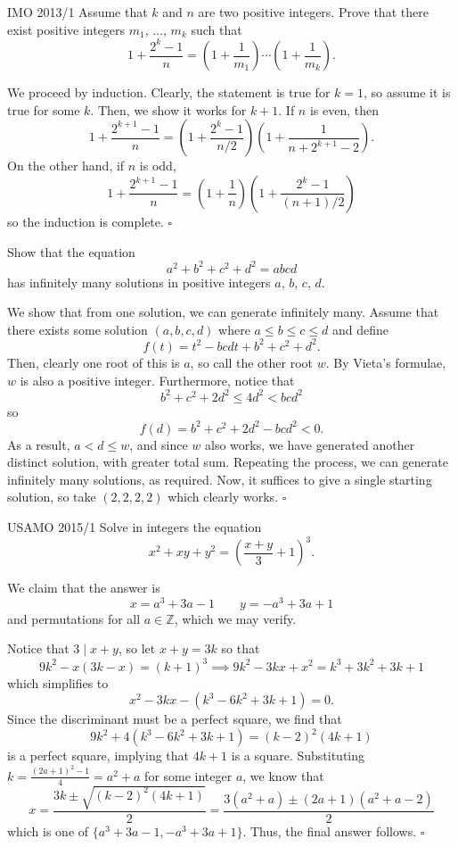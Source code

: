 \documentclass{article}
\begin{document}
\begin{problem}[4.9.11]{IMO 2013/1}
Assume that $k$ and $n$ are two positive integers. Prove that there exist positive integers $m_1$, $\dots$, $m_k$ such that \[1+\dfrac{2^k-1}{n} = \left(1+\dfrac{1}{m_1}\right)\cdots\left(1+\dfrac{1}{m_k}\right).\]
\end{problem}

We proceed by induction. Clearly, the statement is true for $k = 1$, so assume it is true for some $k$. Then, we show it works for $k+1$. If $n$ is even, then \[1+\dfrac{2^{k+1}-1}{n} = \left(1+\dfrac{2^k-1}{n/2}\right)\left(1+\dfrac{1}{n+2^{k+1}-2}\right).\] On the other hand, if $n$ is odd, \[1+\dfrac{2^{k+1}-1}{n} = \left(1+\dfrac{1}{n}\right)\left(1+\dfrac{2^k-1}{(n+1)/2}\right)\] so the induction is complete. $\square$

\begin{problem}[4.9.12]{}
Show that the equation \[a^2+b^2+c^2+d^2 = abcd\] has infinitely many solutions in positive integers $a$, $b$, $c$, $d$.
\end{problem}

We show that from one solution, we can generate infinitely many. Assume that there exists some solution $(a, b, c, d)$ where $a \le b \le c \le d$ and define \[f(t) = t^2-bcdt+b^2+c^2+d^2.\] Then, clearly one root of this is $a$, so call the other root $w$. By Vieta's formulae, $w$ is also a positive integer. Furthermore, notice that \[b^2+c^2+2d^2 \le 4d^2 < bcd^2\] so \[f(d) = b^2+c^2+2d^2-bcd^2 < 0.\] As a result, $a < d \le w$, and since $w$ also works, we have generated another distinct solution, with greater total sum. Repeating the process, we can generate infinitely many solutions, as required. Now, it suffices to give a single starting solution, so take $(2, 2, 2, 2)$ which clearly works. $\square$

\begin{problem}[4.9.13]{USAMO 2015/1}
Solve in integers the equation \[x^2+xy+y^2 = \left(\dfrac{x+y}{3}+1\right)^3.\]
\end{problem}

We claim that the answer is \[x = a^3+3a-1 \qquad y = -a^3+3a+1\] and permutations for all $a \in \mathbb{Z}$, which we may verify.

Notice that $3 \mid x+y$, so let $x+y = 3k$ so that \[9k^2-x(3k-x) = (k+1)^3 \implies 9k^2-3kx+x^2 = k^3+3k^2+3k+1\] which simplifies to \[x^2-3kx-(k^3-6k^2+3k+1) = 0.\] Since the discriminant must be a perfect square, we find that \[9k^2+4(k^3-6k^2+3k+1) = (k - 2)^2 (4 k + 1)\] is a perfect square, implying that $4k+1$ is a square. Substituting $k = \tfrac{(2a+1)^2-1}{4} = a^2+a$ for some integer $a$, we know that \[x = \dfrac{3k \pm \sqrt{(k-2)^2(4k+1)}}{2} = \dfrac{3(a^2+a) \pm (2a+1)(a^2+a-2)}{2}\] which is one of $\{a^3+3a-1, -a^3+3a+1\}$. Thus, the final answer follows. $\square$
\end{document}
